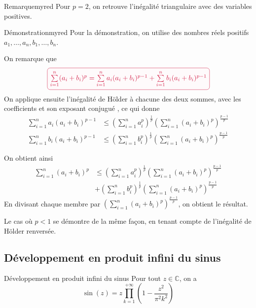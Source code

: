     \begin{omed}{Remarque}{myred}
        Pour $p = 2$, on retrouve l’inégalité triangulaire avec des variables positives.
    \end{omed}

    \begin{demo}{Démonstration}{myred}
        Pour la démonstration, on utilise des nombres réels positifs $a_1,\ldots,a_n,b_1,\ldots,b_n$. 
 
    On remarque que 
    \[ \lilbox{myred}{$\sum\limits_{i=1}^n (a_i + b_i)^p = \sum\limits_{i=1}^n a_i (a_i + b_i)^{p-1} + \sum\limits_{i=1}^n b_i (a_i + b_i)^{p-1}$} \] 
    On applique ensuite l’inégalité de Hölder à chacune des deux sommes, avec les coefficients  et son exposant conjugué , ce qui donne 
    \begin{align*}
    \sum\limits_{i=1}^n a_i (a_i + b_i)^{p-1} &\leq \left( \sum_{i=1}^n a_i^p \right)^{\frac{1}{p}} \left( \sum_{i=1}^n (a_i+b_i)^p\right)^{\frac{p-1}{p}} \\
    \sum\limits_{i=1}^n b_i (a_i + b_i)^{p-1} &\leq \left( \sum_{i=1}^n b_i^p \right)^{\frac{1}{p}} \left( \sum_{i=1}^n (a_i+b_i)^p\right)^{\frac{p-1}{p}} 
    \end{align*}

    On obtient ainsi 
    \begin{align*}
    \sum\limits_{i=1}^n (a_i + b_i)^p &\leq \left( \sum_{i=1}^n a_i^p \right)^{\frac{1}{p}} \left( \sum_{i=1}^n (a_i+b_i)^p\right)^{\frac{p-1}{p}} \\
    &+ \left( \sum_{i=1}^n b_i^p \right)^{\frac{1}{p}} \left( \sum_{i=1}^n (a_i+b_i)^p\right)^{\frac{p-1}{p}} 
    \end{align*}
    En divisant chaque membre par $\left( \sum\limits_{i=1}^n (a_i+b_i)^p\right)^\frac{p-1}{p}$, on obtient le résultat.

    Le cas où $p < 1$ se démontre de la même façon, en tenant compte de l’inégalité de Hölder renversée.
    \end{demo}

\subsection{Développement en produit infini du sinus}

    \begin{theo}{Développement en produit infini du sinus}{}
        Pour tout $z \in \mathbb{C}$, on a 
        \[ \sin(z) = z \prod_{k=1}^{+\infty} \left(1 - \frac{z^2}{\pi^2 k^2}\right) \]
    \end{theo}

